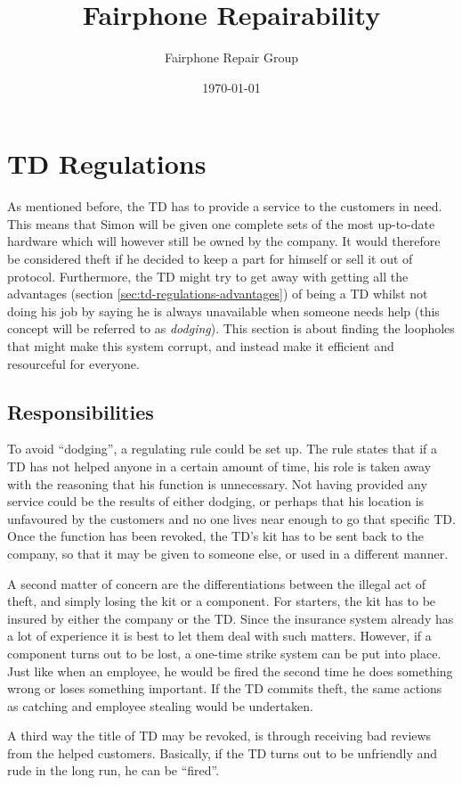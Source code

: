 \documentclass[final,a4paper]{report} %
\author{Fairphone Repair Group}
\title{Fairphone Repairability}
\date{\today}
\begin{document}
	\section{TD Regulations}
	\label{sec:td-regulations}
	As mentioned before, the TD has to provide a service to the customers in need. This means that Simon will be given one complete sets of the most up-to-date hardware which will however still be owned by the company. It would therefore be considered theft if he decided to keep a part for himself or sell it out of protocol. Furthermore, the TD might try to get away with getting all the advantages (section \ref{sec:td-regulations-advantages}) of being a TD whilst not doing his job by saying he is always unavailable when someone needs help (this concept will be referred to as \textit{dodging}). This section is about finding the loopholes that might make this system corrupt, and instead make it efficient and resourceful for everyone.
	
	\subsection{Responsibilities}
	To avoid ``dodging'', a regulating rule could be set up. The rule states that if a TD has not helped anyone in a certain amount of time, his role is taken away with the reasoning that his function is unnecessary. Not having provided any service could be the results of either dodging, or perhaps that his location is unfavoured by the customers and no one lives near enough to go that specific TD. Once the function has been revoked, the TD's kit has to be sent back to the company, so that it may be given to someone else, or used in a different manner.
	
	A second matter of concern are the differentiations between the illegal act of theft, and simply losing the kit or a component. For starters, the kit has to be insured by either the company or the TD. Since the insurance system already has a lot of experience it is best to let them deal with such matters. However, if a component turns out to be lost, a one-time strike system can be put into place. Just like when an employee, he would be fired the second time he does something wrong or loses something important. If the TD commits theft, the same actions as catching and employee stealing would be undertaken. 
	
	A third way the title of TD may be revoked, is through receiving bad reviews from the helped customers. Basically, if the TD turns out to be unfriendly and rude in the long run, he can be ``fired''.
	
\end{document}
